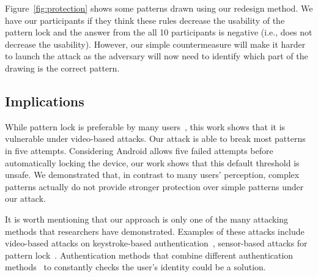 Figure~\ref{fig:protection} shows some patterns drawn using our redesign method. We have our participants if they think these rules decrease
the usability  of the pattern lock and the answer from the all 10 participants is negative (i.e., does not decrease the usability).
However, our simple countermeasure will make it harder to launch the attack as the adversary will now need to
identify which part of the drawing is the correct pattern.%



\subsection{Implications}
While pattern lock is preferable by many users~\cite{androidstudy}, this     work shows
that it is vulnerable under video-based attacks. Our attack
is able to break most patterns in five attempts. Considering Android
allows five failed attempts before automatically locking the device, our work
shows that this default threshold is unsafe. We demonstrated that, in contrast to many users'
perception, complex patterns actually do not provide stronger protection over simple patterns under our attack.

It is worth mentioning that our approach is only one of the many attacking
methods that researchers have demonstrated. Examples of these attacks include
video-based attacks on keystroke-based authentication~\cite{shukla2014beware,yue2014blind}, sensor-based attacks for
pattern lock~\cite{zhang2016privacy}. Authentication methods that combine different
authentication methods~\cite{de2012touch,stefan2012robustness,lingsecure,mannan2007using} to constantly checks the user's identity could be
a solution. %



